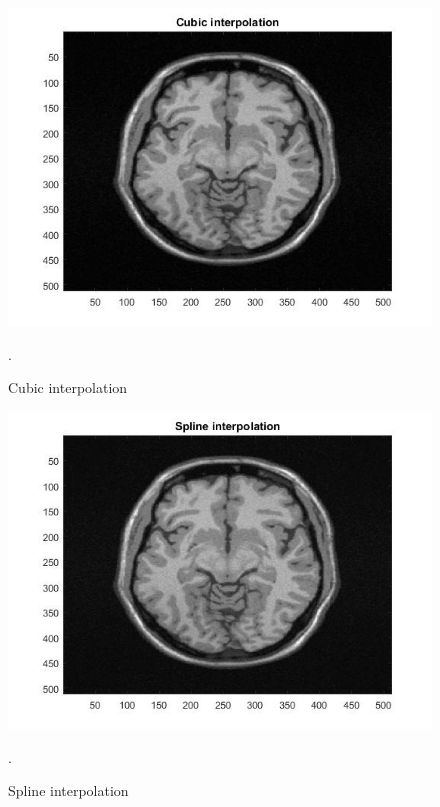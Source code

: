 \begin{enumerate}
\begin{figure}[H]
\centering{}\includegraphics[scale=0.4]{figures/Module_10/Module_10_c}\caption{Cubic interpolation}. 
\label{fig: Module10_c}
\end{figure}

\begin{figure}[H]
\centering{}\includegraphics[scale=0.4]{figures/Module_10/Module_10_s}\caption{Spline interpolation}. 
\label{fig: Module10_s}
\end{figure}


\end{enumerate}
